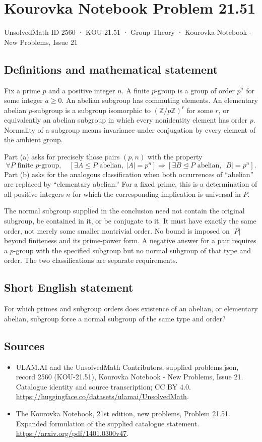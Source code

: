 \documentclass[11pt,a4paper]{article}
\begin{document}
\section*{Kourovka Notebook Problem 21.51}\label{2560}
{\small UnsolvedMath ID 2560 · KOU-21.51 · Group Theory · Kourovka Notebook - New Problems, Issue 21}
\subsection{Definitions and mathematical statement}
Fix a prime $p$ and a positive integer $n$. A finite $p$-group is a
group of order $p^a$ for some integer $a\ge0$. An abelian subgroup
has commuting elements. An elementary abelian $p$-subgroup is a subgroup
isomorphic to $(\mathbb Z/p\mathbb Z)^r$ for some $r$, or equivalently
an abelian subgroup in which every nonidentity element has order $p$.
Normality of a subgroup means invariance under conjugation by every
element of the ambient group.

Part (a) asks for precisely those pairs $(p,n)$ with the property
\[
 \forall P\text{ finite }p\text{-group},\quad
 [\exists A\le P\text{ abelian},\ |A|=p^n]
 \Longrightarrow
 [\exists B\trianglelefteq P\text{ abelian},\ |B|=p^n].
\]
Part (b) asks for the analogous classification when both occurrences
of ``abelian'' are replaced by ``elementary abelian.''
For a fixed prime, this is a determination of all positive integers
$n$ for which the corresponding implication is universal in $P$.

The normal subgroup supplied in the conclusion need not contain the
original subgroup, be contained in it, or be conjugate to it. It must
have exactly the same order, not merely some smaller nontrivial order.
No bound is imposed on $|P|$ beyond finiteness and its prime-power
form. A negative answer for a pair requires a $p$-group with the
specified subgroup but no normal subgroup of that type and order.
The two classifications are separate requirements.
\subsection{Short English statement}
For which primes and subgroup orders does existence of an abelian, or elementary abelian, subgroup force a normal subgroup of the same type and order?
\subsection{Sources}
\begin{itemize}
\item[S1] ULAM.AI and the UnsolvedMath Contributors, supplied problems.json, record 2560 (KOU-21.51), Kourovka Notebook - New Problems, Issue 21. Catalogue identity and source transcription; CC BY 4.0.
\url{https://huggingface.co/datasets/ulamai/UnsolvedMath}.
\item[S2] The Kourovka Notebook, 21st edition, new problems, Problem 21.51. Expanded formulation of the supplied catalogue statement.
\url{https://arxiv.org/pdf/1401.0300v47}.
\end{itemize}
\end{document}
